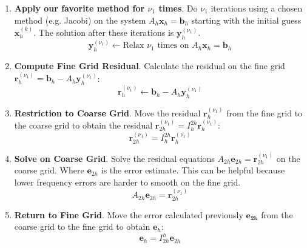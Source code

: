\begin{enumerate}
    \item \textbf{Apply our favorite method for $\nu_{1}$ times}. Do $\nu_{1}$ iterations using a chosen method (e.g. Jacobi) on the system $A_{h}\mathbf{x}_{h} = \mathbf{b}_{h}$ starting with the initial guess $\mathbf{x}_{h}^{\left(k\right)}$. The solution after these iterations is $\mathbf{y}_{h}^{\left(\nu_{1}\right)}$.
    \begin{equation*}
        \mathbf{y}_{h}^{\left(\nu_{1}\right)} \leftarrow \text{Relax } \nu_{1} \text{ times on } A_{h}\mathbf{x}_{h} = \mathbf{b}_{h}
    \end{equation*}

    \item \textbf{Compute Fine Grid Residual}. Calculate the residual on the fine grid $\mathbf{r}_{h}^{\left(\nu_{1}\right)} = \mathbf{b}_{h} - A_{h}\mathbf{y}_{h}^{\left(\nu_{1}\right)}$:
    \begin{equation*}
        \mathbf{r}_{h}^{\left(\nu_{1}\right)} \leftarrow \mathbf{b}_{h} - A_{h}\mathbf{y}_{h}^{\left(\nu_{1}\right)}
    \end{equation*}

    \item \textbf{Restriction to Coarse Grid}. Move the residual $\mathbf{r}_{h}^{\left(\nu_{1}\right)}$ from the fine grid to the coarse grid to obtain the residual $\mathbf{r}_{2h}^{\left(\nu_{1}\right)} = I_{h}^{2h} \mathbf{r}_{h}^{\left(\nu_{1}\right)}$:
    \begin{equation*}
        \mathbf{r}_{2h}^{\left(\nu_{1}\right)} = I_{h}^{2h} \mathbf{r}_{h}^{\left(\nu_{1}\right)}
    \end{equation*}

    \item \textbf{Solve on Coarse Grid}. Solve the residual equations $A_{2h}\mathbf{e}_{2h} = \mathbf{r}_{2h}^{\left(\nu_{1}\right)}$ on the coarse grid. Where $\mathbf{e}_{2h}$ is the error estimate. This can be helpful because lower frequency errors are harder to smooth on the fine grid.
    \begin{equation}
        A_{2h}\mathbf{e}_{2h} = \mathbf{r}_{2h}^{\left(\nu_{1}\right)}
    \end{equation}

    \item \textbf{Return to Fine Grid}. Move the error calculated previously $\mathbf{e_{2h}}$ from the coarse grid to the fine grid to obtain $\mathbf{e}_{h}$:
    \begin{equation*}
        \mathbf{e}_{h} = I_{2h}^{h}\mathbf{e}_{2h}
    \end{equation*}


\end{enumerate}

